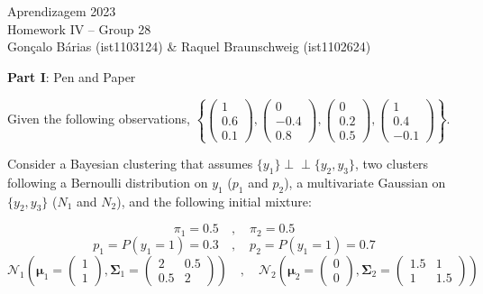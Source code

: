 \documentclass[12pt]{article}
\newcommand{\ind}{\perp\!\!\!\perp}
\begin{document}
\begin{center}
\large{Aprendizagem 2023} \\
Homework IV -- Group 28 \\
\vskip 0.3cm
Gonçalo Bárias (ist1103124) \& Raquel Braunschweig (ist1102624)\vskip 1cm

\large{\textbf{Part I}: Pen and Paper}\normalsize
\end{center}

\noindent Given the following observations, $\left\{\begin{pmatrix} 1 \\ 0.6 \\ 0.1 \end{pmatrix}, \begin{pmatrix} 0 \\ -0.4 \\ 0.8 \end{pmatrix}, \begin{pmatrix} 0 \\ 0.2 \\ 0.5 \end{pmatrix},
\begin{pmatrix} 1 \\ 0.4 \\ -0.1 \end{pmatrix}\right\}$.

\vskip 0.2cm
\noindent Consider a Bayesian clustering that assumes $\{y_1\} \ind \{y_2, y_3\}$, two clusters following a Bernoulli distribution on $y_1$ ($p_1$ and $p_2$), a multivariate Gaussian on $\{y_2, y_3\}$ ($N_1$ and $N_2$),
and the following initial mixture:

\vskip -0.3cm
\begin{equation*}
    \pi_1 = 0.5 \quad , \quad \pi_2 = 0.5
\end{equation*}
\begin{equation*}
    p_1 = P(y_1 = 1) = 0.3 \quad , \quad p_2 = P(y_1 = 1) = 0.7
\end{equation*}
\begin{equation*}
    \mathcal{N}_1 \left(\boldsymbol{\mu}_1 = \begin{pmatrix} 1 \\ 1 \end{pmatrix}, \mathbf{\Sigma}_1 = \begin{pmatrix} 2 & 0.5 \\ 0.5 & 2 \end{pmatrix}\right) \quad
    , \quad \mathcal{N}_2 \left(\boldsymbol{\mu}_2 = \begin{pmatrix} 0 \\ 0 \end{pmatrix}, \mathbf{\Sigma}_2 = \begin{pmatrix} 1.5 & 1 \\ 1 & 1.5 \end{pmatrix}\right)
\end{equation*}
\end{document}
